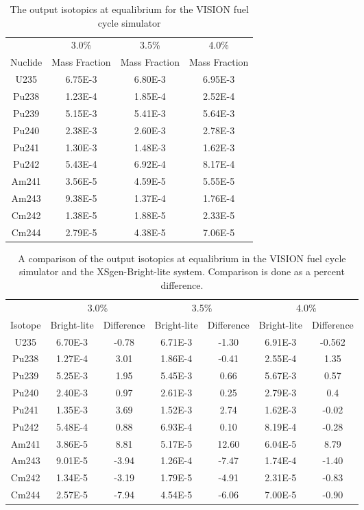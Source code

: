 \documentclass{article}
\begin{document}
\begin{table}[!htb]
\centering
\small
\caption{The output isotopics at equalibrium for the VISION fuel cycle simulator}
\label{tab:a}
\vspace{0.5em}
\begin{tabular}{cccc}
 & \multicolumn{1}{c}{3.0\%} & \multicolumn{1}{c}{3.5\%} & \multicolumn{1}{c}{4.0\%} \\
Nuclide & Mass Fraction & Mass Fraction & Mass Fraction \\
\hline
U235  & 6.75E-3 & 6.80E-3 & 6.95E-3 \\
Pu238 & 1.23E-4 & 1.85E-4 & 2.52E-4 \\
Pu239 & 5.15E-3 & 5.41E-3 & 5.64E-3 \\
Pu240 & 2.38E-3 & 2.60E-3 & 2.78E-3 \\
Pu241 & 1.30E-3 & 1.48E-3 & 1.62E-3 \\
Pu242 & 5.43E-4 & 6.92E-4 & 8.17E-4 \\
Am241 & 3.56E-5 & 4.59E-5 & 5.55E-5 \\
Am243 & 9.38E-5 & 1.37E-4 & 1.76E-4 \\
Cm242 & 1.38E-5 & 1.88E-5 & 2.33E-5 \\
Cm244 & 2.79E-5 & 4.38E-5 & 7.06E-5 \\
\hline
\end{tabular}
\end{table}

\begin{table}[!htb]
\centering
\small
\caption{A comparison of the output isotopics at equalibrium in the VISION fuel cycle simulator and the XSgen-Bright-lite system. Comparison is done as a percent difference.}
\label{tab:xsgenresults}
\vspace{0.5em}
\begin{tabular}{c cc | cc | cc }
 & \multicolumn{2}{c}{3.0\%} & \multicolumn{2}{c}{3.5\%} & \multicolumn{2}{c}{4.0\%} \\
Isotope & Bright-lite & Difference & Bright-lite & Difference & Bright-lite & Difference  \\
\hline
U235 & 6.70E-3 & -0.78 & 6.71E-3 & -1.30 & 6.91E-3 & -0.562 \\
Pu238 & 1.27E-4 & 3.01 & 1.86E-4 & -0.41 & 2.55E-4 & 1.35 \\
Pu239 & 5.25E-3 & 1.95 & 5.45E-3 & 0.66 & 5.67E-3 & 0.57 \\
Pu240 & 2.40E-3 & 0.97 & 2.61E-3 & 0.25 & 2.79E-3 & 0.4 \\
Pu241 & 1.35E-3 & 3.69 & 1.52E-3 & 2.74 & 1.62E-3 & -0.02 \\
Pu242 & 5.48E-4 & 0.88 & 6.93E-4 & 0.10 & 8.19E-4 & -0.28 \\
Am241 & 3.86E-5 & 8.81 & 5.17E-5 & 12.60 & 6.04E-5 & 8.79 \\
Am243 & 9.01E-5 & -3.94 & 1.26E-4 & -7.47 & 1.74E-4 & -1.40 \\
Cm242 & 1.34E-5 & -3.19 & 1.79E-5 & -4.91 & 2.31E-5 & -0.83 \\
Cm244 & 2.57E-5 & -7.94 & 4.54E-5 & -6.06 & 7.00E-5 & -0.90 \\
\hline
\end{tabular}
\end{table}
\end{document}
